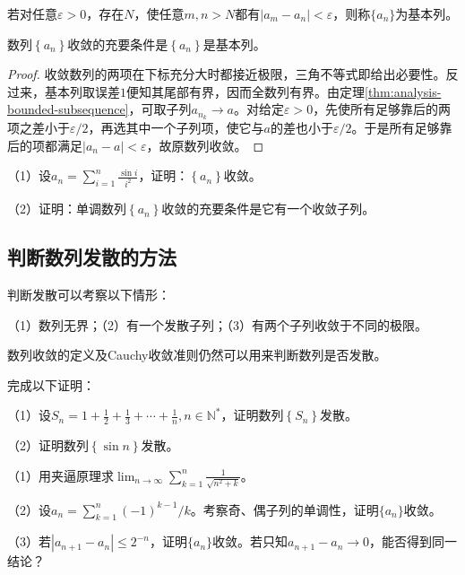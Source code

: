\begin{definition}
若对任意\(\varepsilon>0\)，存在\(N\)，使任意\(m,n>N\)都有\(|a_m-a_n|<\varepsilon\)，则称\(\{a_n\}\)为{\heiti{}基本列}。
\end{definition}
\begin{samepage}
\begin{theorem}[Cauchy收敛准则]
    数列\(\left\{ a_{n} \right\}\)收敛的充要条件是\(\left\{ a_{n} \right\}\)是基本列。
\end{theorem}

\begin{proof}
收敛数列的两项在下标充分大时都接近极限，三角不等式即给出必要性。反过来，基本列取误差\(1\)便知其尾部有界，因而全数列有界。由定理\ref{thm:analysis-bounded-subsequence}，可取子列\(a_{n_k}\to a\)。对给定\(\varepsilon>0\)，先使所有足够靠后的两项之差小于\(\varepsilon/2\)，再选其中一个子列项，使它与\(a\)的差也小于\(\varepsilon/2\)。于是所有足够靠后的项都满足\(|a_n-a|<\varepsilon\)，故原数列收敛。
\end{proof}
\end{samepage}

\begin{example}
    （1）设\(a_{n} = \sum _{i = 1}^{n} \frac{\sin i}{i^{2}}\)，证明：\(\left\{ a_{n} \right\}\)收敛。

    （2）证明：单调数列\(\left\{ a_{n} \right\}\)收敛的充要条件是它有一个收敛子列。
\end{example}

\subsection{判断数列发散的方法}
判断发散可以考察以下情形：

（1）数列无界；（2）有一个发散子列；（3）有两个子列收敛于不同的极限。

数列收敛的定义及Cauchy收敛准则仍然可以用来判断数列是否发散。

\par\noindent\begin{minipage}{\linewidth}
\setlength{\parindent}{2em}\setlength{\parskip}{6pt}
\begin{example}
    完成以下证明：

    （1）设\(S_{n} = 1 + \frac{1}{2} + \frac{1}{3} + \cdots + \frac{1}{n} , n \in
    \mathbb{N}^{*}\)，证明数列\(\left\{ S_{n} \right\}\)发散。

    （2）证明数列\(\left\{ \sin n \right\}\)发散。
\end{example}
\end{minipage}

\begin{exercise}
\label{ex:analysis-convergence-tools}
\mbox{}\par\nobreak

（1）用夹逼原理求\(\displaystyle\lim_{n\to\infty}\sum_{k=1}^{n}\frac1{\sqrt{n^2+k}}\)。

（2）设\(a_n=\sum_{k=1}^{n}(-1)^{k-1}/k\)。考察奇、偶子列的单调性，证明\(\{a_n\}\)收敛。

（3）若\(|a_{n+1}-a_n|\le2^{-n}\)，证明\(\{a_n\}\)收敛。若只知\(a_{n+1}-a_n\to0\)，能否得到同一结论？
\end{exercise}
